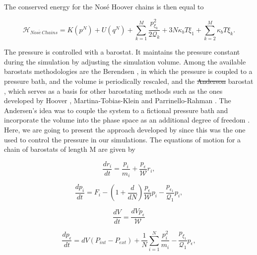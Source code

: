 \documentclass[
	12pt,				%
	openany,			%
	oneside,			%
	a4paper,			%
	english,			%
	brazil				%
	]{abntex2}
\providecommand{\DIFadd}[1]{{\protect\color{blue}\uwave{#1}}}
\providecommand{\DIFdel}[1]{{\protect\color{red}\sout{#1}}}
\providecommand{\DIFaddbegin}{}
\providecommand{\DIFaddend}{}
\providecommand{\DIFdelbegin}{}
\providecommand{\DIFdelend}{}
\providecommand{\DIFadd}[1]{{\protect\color{blue}\uwave{#1}}} %
\providecommand{\DIFdel}[1]{{\protect\color{red}\sout{#1}}}                      %
\providecommand{\DIFaddbegin}{} %
\providecommand{\DIFaddend}{} %
\providecommand{\DIFdelbegin}{} %
\providecommand{\DIFdelend}{} %
\begin{document}
The conserved energy for the Nos\'{e} Hoover chains is then equal to

\begin{equation}
\mathcal{H}_{Nos\acute{e} \, Chains} =  K(p^{N}) + U(q^{N})  + \sum_{k=1}^{M }\frac{p^{2}_{\xi _{k}}}{2\mathcal{Q} _{k}} + 3N\kappa_{b}T \xi _{1} + \sum_{k=2}^{M} \kappa_{b}T \xi _{k}.
\end{equation}

The pressure is controlled with a barostat. It maintains the pressure constant during the simulation by adjusting the simulation volume. Among the available  barostats methodologies are the Berendsen \cite{doi:10.1063/1.448118}, in which the pressure is coupled to a pressure bath, and the volume is periodically rescaled, and the \DIFdelbegin \DIFdel{Anderson }\DIFdelend \DIFaddbegin \DIFadd{Andersen }\DIFaddend barostat \cite{1980JChPh722384A}, which serves as a basis for other barostating methods such as the ones developed by Hoover \cite{PhysRevA.31.1695}, Martina-Tobias-Klein \cite{doi:10.1063/1.467468} and Parrinello-Rahman \cite{doi:10.1063/1.328693}. The Andersen's idea was to couple the system to a fictional pressure bath and incorporate the volume into the phase space as an additional degree of freedom \cite{tuckerman}. Here, we are going to present the approach developed by  since this was the one used to control the pressure in our simulations. The equations of motion for a chain of barostats of length M are given by  

\begin{equation}
\frac{dr_{i}}{dt} = \frac{p_i}{m_i} + \frac{p_{\epsilon}}{\mathcal{W}} r_i,
\end{equation}

\begin{equation}
\frac{dp_{i}}{dt} = F_i  - \left(1 + \frac{d}{dN}\right) \frac{p_{\epsilon}}{\mathcal{W}} p_{i} - \frac{p_{\epsilon _{1}}}{\mathcal{Q} _1} p_{i},
\end{equation}

\begin{equation}
\frac{dV}{dt} = \frac{d V p_{\epsilon}}{\mathcal{W} }
\end{equation}

\begin{equation}
\frac{dp_{\epsilon}}{dt} = dV (    P_{int} -P_{ext}) + \frac{1}{N} \sum_{i=1}^{N} \frac{p_{i}^{2}}{m_i} - \frac{p_{\xi _{1}}}{{\mathcal{Q} _1}}p_{\epsilon},
\end{equation}
\end{document}
